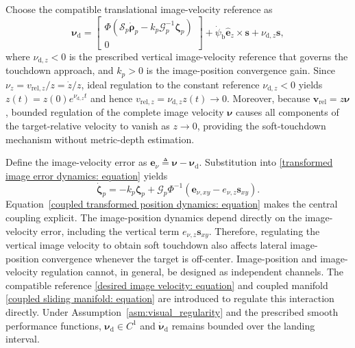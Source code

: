 \documentclass[10pt,conference]{IEEEtran}
\begin{document}
Choose the compatible translational image-velocity reference as
\begin{equation}
    \boldsymbol\nu_{\mathrm d} = \begin{bmatrix} \Phi\left(\mathcal S_p\dot{\boldsymbol\rho}_p - k_p\mathcal G_p^{-1}\boldsymbol\zeta_p \right)\\[1mm] 0 \end{bmatrix} + \dot{\psi}_{\mathrm b} \hat{\boldsymbol e}_{z}\times\boldsymbol s + \nu_{\mathrm d,z}\boldsymbol s,
    \label{desired image velocity: equation}
\end{equation}
where $\nu_{\mathrm d,z}<0$ is the prescribed vertical image-velocity reference that governs the touchdown approach, and $k_p>0$ is the image-position convergence gain.
Since $\nu_z=v_{\mathrm{rel},z}/z=\dot z/z$, ideal regulation to the constant reference $\nu_{\mathrm d,z}<0$ yields $z(t)=z(0)e^{\nu_{\mathrm d,z}t}$ and hence $v_{\mathrm{rel},z}=\nu_{\mathrm d,z}z(t)\to0$.
Moreover, because $\boldsymbol v_{\mathrm{rel}}=z\boldsymbol\nu$, bounded regulation of the complete image velocity $\boldsymbol\nu$ causes all components of the target-relative velocity to vanish as $z\to0$, providing the soft-touchdown mechanism without metric-depth estimation.

Define the image-velocity error as $\boldsymbol e_{\nu} \triangleq \boldsymbol\nu-\boldsymbol\nu_{\mathrm d}$.
Substitution into \eqref{transformed image error dynamics: equation} yields
\begin{equation}
    \dot{\boldsymbol\zeta}_p = - k_p\boldsymbol\zeta_p + \mathcal G_p\Phi^{-1} \left( \boldsymbol e_{\nu,xy} - e_{\nu,z}\boldsymbol s_{xy} \right).
    \label{coupled transformed position dynamics: equation}
\end{equation}
Equation~\eqref{coupled transformed position dynamics: equation} makes the central coupling explicit. The image-position dynamics depend directly on the image-velocity error, including the vertical term $e_{\nu,z}\boldsymbol{s}_{xy}$. Therefore, regulating the vertical image velocity to obtain soft touchdown also affects lateral image-position convergence whenever the target is
off-center. Image-position and image-velocity regulation cannot, in general, be designed as independent channels. The compatible reference \eqref{desired image velocity: equation} and coupled manifold \eqref{coupled sliding manifold: equation} are introduced to regulate this interaction directly.
Under Assumption~\ref{asm:visual_regularity} and the prescribed smooth performance functions, $\boldsymbol\nu_{\mathrm d}\in C^1$ and $\dot{\boldsymbol\nu}_{\mathrm d}$ remains bounded over the landing interval.
\end{document}
